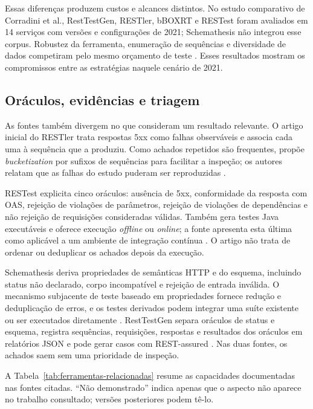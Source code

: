 Essas diferenças produzem custos e alcances distintos. No estudo comparativo
de Corradini et al., RestTestGen, RESTler, bBOXRT e RESTest foram avaliados em
14 serviços com versões e configurações de 2021; Schemathesis não integrou esse
corpus. Robustez da ferramenta, enumeração de sequências e diversidade de dados
competiram pelo mesmo orçamento de teste \cite{corradini2021comparison}. Esses
resultados mostram os compromissos entre as estratégias naquele cenário de 2021.

\subsection{Oráculos, evidências e triagem}

As fontes também divergem no que consideram um resultado relevante. O artigo
inicial do RESTler trata respostas 5xx como falhas observáveis e associa cada uma
à sequência que a produziu. Como achados repetidos são frequentes, propõe
\emph{bucketization} por sufixos de sequências para facilitar a inspeção; os
autores relatam que as falhas do estudo puderam ser reproduzidas
\cite{atlidakis2019restler}.

RESTest explicita cinco oráculos: ausência de 5xx, conformidade da resposta com
OAS, rejeição de violações de parâmetros, rejeição de violações de dependências
e não rejeição de requisições consideradas válidas. Também gera testes Java
executáveis e oferece execução \textit{offline} ou \textit{online}; a fonte apresenta esta última
como aplicável a um ambiente de integração contínua
\cite{martinlopez2020restest}. O artigo não trata de ordenar ou deduplicar os
achados depois da execução.

Schemathesis deriva propriedades de semânticas HTTP e do esquema, incluindo
status não declarado, corpo incompatível e rejeição de entrada inválida. O
mecanismo subjacente de teste baseado em propriedades fornece redução e deduplicação de
erros, e os testes derivados podem integrar uma suíte existente ou ser
executados diretamente \cite{hatfielddodds2021schemathesis}. RestTestGen
separa oráculos de status e esquema, registra sequências, requisições, respostas
e resultados dos oráculos em relatórios JSON e pode gerar casos com
REST-assured \cite{corradini2022resttestgen}. Nas duas fontes, os achados
saem sem uma prioridade de inspeção.

A Tabela~\ref{tab:ferramentas-relacionadas} resume as capacidades documentadas
nas fontes citadas. ``Não demonstrado'' indica apenas que o aspecto não aparece
no trabalho consultado; versões posteriores podem tê-lo.

